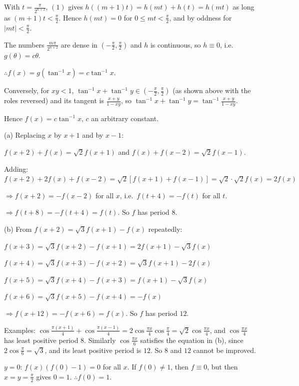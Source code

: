   With $t = \frac{\pi}{2^{n + 2}}$, $(1)$ gives $h((m + 1)t) = h(mt) + h(t) = h(mt)$ as long as $(m + 1)t <
  \frac{\pi}{2}$. Hence $h(mt) = 0$ for $0\le mt < \frac{\pi}{2}$, and by oddness for $|mt| < \frac{\pi}{2}$.

  The numbers $\frac{m\pi}{2^{n + 2}}$ are dense in $\left(-\frac{\pi}{2}, \frac{\pi}{2}\right)$ and $h$ is
  continuous, so $h\equiv 0$, i.e.\ $g(\theta) = c\theta$.

  $\therefore f(x) = g\left(\tan^{-1}x\right) = c\tan^{-1}x$.

  Conversely, for $xy < 1$, $\tan^{-1}x + \tan^{-1}y\in\left(-\frac{\pi}{2}, \frac{\pi}{2}\right)$ (as shown above
  with the roles reversed) and its tangent is $\frac{x + y}{1 - xy}$, so $\tan^{-1}x + \tan^{-1}y = \tan^{-1}\frac{x
  + y}{1 - xy}$.

  Hence $f(x) = c\tan^{-1}x$, $c$ an arbitrary constant.
\item (a) Replacing $x$ by $x + 1$ and by $x - 1$:

  $f(x + 2) + f(x) = \sqrt{2}f(x + 1)$ and $f(x) + f(x - 2) = \sqrt{2}f(x - 1)$.

  Adding: $f(x + 2) + 2f(x) + f(x - 2) = \sqrt{2}[f(x + 1) + f(x - 1)] = \sqrt{2}\cdot\sqrt{2}f(x) = 2f(x)$

  $\Rightarrow f(x + 2) = -f(x - 2)$ for all $x$, i.e.\ $f(t + 4) = -f(t)$ for all $t$.

  $\Rightarrow f(t + 8) = -f(t + 4) = f(t)$. So $f$ has period $8$.

  (b) From $f(x + 2) = \sqrt{3}f(x + 1) - f(x)$ repeatedly:

  $f(x + 3) = \sqrt{3}f(x + 2) - f(x + 1) = 2f(x + 1) - \sqrt{3}f(x)$

  $f(x + 4) = \sqrt{3}f(x + 3) - f(x + 2) = \sqrt{3}f(x + 1) - 2f(x)$

  $f(x + 5) = \sqrt{3}f(x + 4) - f(x + 3) = f(x + 1) - \sqrt{3}f(x)$

  $f(x + 6) = \sqrt{3}f(x + 5) - f(x + 4) = -f(x)$

  $\Rightarrow f(x + 12) = -f(x + 6) = f(x)$. So $f$ has period $12$.

  Examples: $\cos\frac{\pi(x + 1)}{4} + \cos\frac{\pi(x - 1)}{4} = 2\cos\frac{\pi x}{4}\cos\frac{\pi}{4} =
  \sqrt{2}\cos\frac{\pi x}{4}$, and $\cos\frac{\pi x}{4}$ has least positive period $8$. Similarly $\cos\frac{\pi
  x}{6}$ satisfies the equation in (b), since $2\cos\frac{\pi}{6} = \sqrt{3}$, and its least positive period is $12$.
  So $8$ and $12$ cannot be improved.
\item $y = 0$: $f(x)(f(0) - 1) = 0$ for all $x$. If $f(0)\neq 1$, then $f\equiv 0$, but then $x = y = \frac{\pi}{2}$
  gives $0 = 1$. $\therefore f(0) = 1$.

